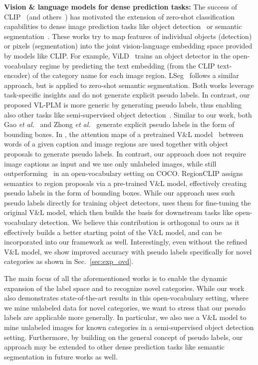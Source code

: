 \documentclass[runningheads]{llncs}
\begin{document}
\vspace{1mm}
\noindent \textbf{Vision \& language models for dense prediction tasks:} 
The success of CLIP~\cite{radford_arxiv_2021} (and others~\cite{jia_icml_21,ALBEF}) has motivated the extension of zero-shot classification capabilities to dense image prediction tasks like object detection~\cite{gu_iclr_22,huynh2021openvocabulary,shi2022proposalclip,zareian_cvpr_21} or semantic segmentation~\cite{li_iclr_22,rao2021denseclip,xu2021simple,zhou2021denseclip}.
These works try to map features of individual objects (detection) or pixels (segmentation) into the joint vision-language embedding space provided by models like CLIP.
For example, ViLD~\cite{gu_iclr_22} trains an object detector in the open-vocabulary regime by predicting the text embedding (from the CLIP text-encoder) of the category name for each image region. LSeg~\cite{li_iclr_22} follows a similar approach, but is applied to zero-shot semantic segmentation.  Both works leverage task-specific insights and do not generate explicit pseudo labels.  In contrast, our proposed VL-PLM is more generic by generating pseudo labels, thus enabling also other tasks like semi-supervised object detection~\cite{sohn2020detection}.
Similar to our work, both Gao \emph{et al.}~\cite{gao2021open} and Zhong \emph{et al.}~\cite{zhong2021regionclip} generate explicit pseudo labels in the form of bounding boxes.
In \cite{gao2021open}, the attention maps of a pretrained V\&L model~\cite{ALBEF} between words of a given caption and image regions are used together with object proposals to generate pseudo labels.  
In contrast, our approach does not require image captions as input and we use only unlabeled images, while still outperforming~\cite{gao2021open} in an open-vocabulary setting on COCO.  
RegionCLIP \cite{zhong2021regionclip} assigns semantics to region proposals via a pre-trained V\&L model, effectively creating pseudo labels in the form of bounding boxes. 
While our approach uses such pseudo labels directly for training object detectors, \cite{zhong2021regionclip} uses them for fine-tuning the original V\&L model, which then builds the basis for downstream tasks like open-vocabulary detection.  
We believe this contribution is orthogonal to ours as it effectively builds a better starting point of the V\&L model, and can be incorporated into our framework as well. Interestingly, even without the refined V\&L model, we show improved accuracy with pseudo labels specifically for novel categories as shown in Sec.~\ref{sec:exp_ovd}.

The main focus of all the aforementioned works is to enable the dynamic expansion of the label space and to recognize novel categories.  While our work also demonstrates state-of-the-art results in this open-vocabulary setting, where we mine unlabeled data for novel categories, we want to stress that our pseudo labels are applicable more generally.  In particular, we also use a V\&L model to mine unlabeled images for known categories in a semi-supervised object detection setting.
Furthermore, by building on the general concept of pseudo labels, our approach may be extended to other dense prediction tasks like semantic segmentation in future works as well.
\end{document}
